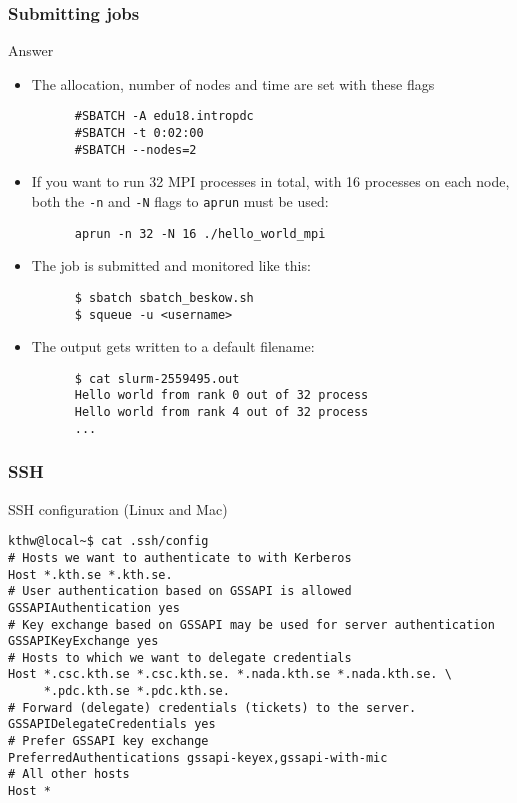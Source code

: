 \begin{frame}[fragile]
  \frametitle{Submitting jobs}
\begin{exampleblock}{{Answer}}
    \verbatimfont{\footnotesize}
    \begin{itemize}
    \item The allocation, number of nodes and time are set with these flags
    \begin{verbatim}
      #SBATCH -A edu18.intropdc
      #SBATCH -t 0:02:00
      #SBATCH --nodes=2
    \end{verbatim}

    \item If you want to run 32 MPI processes in total, with 16 processes on each node, both the \verb|-n| and \verb|-N| flags 
      to \verb|aprun| must be used:
    \begin{verbatim}
      aprun -n 32 -N 16 ./hello_world_mpi
    \end{verbatim}

    \item The job is submitted and monitored like this:
    \begin{verbatim}
      $ sbatch sbatch_beskow.sh
      $ squeue -u <username>
    \end{verbatim}

    \item The output gets written to a default filename:
    \begin{verbatim}
      $ cat slurm-2559495.out
      Hello world from rank 0 out of 32 process
      Hello world from rank 4 out of 32 process
      ...
    \end{verbatim}

    \end{itemize}

\end{exampleblock}
\end{frame}



\begin{frame}[fragile]
  \frametitle{SSH}
  \begin{alertblock}{SSH configuration (Linux and Mac)}
    \verbatimfont{\footnotesize}
    \begin{verbatim}
kthw@local~$ cat .ssh/config
# Hosts we want to authenticate to with Kerberos
Host *.kth.se *.kth.se.
# User authentication based on GSSAPI is allowed
GSSAPIAuthentication yes
# Key exchange based on GSSAPI may be used for server authentication
GSSAPIKeyExchange yes
# Hosts to which we want to delegate credentials
Host *.csc.kth.se *.csc.kth.se. *.nada.kth.se *.nada.kth.se. \
     *.pdc.kth.se *.pdc.kth.se.
# Forward (delegate) credentials (tickets) to the server.
GSSAPIDelegateCredentials yes
# Prefer GSSAPI key exchange
PreferredAuthentications gssapi-keyex,gssapi-with-mic
# All other hosts
Host *

 \end{verbatim}
\end{alertblock}

\end{frame}

